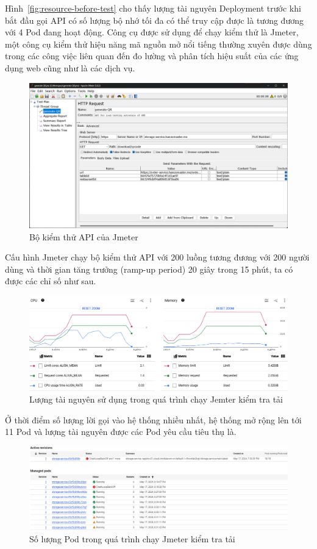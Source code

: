 Hình~\ref{fig:resource-before-test} cho thấy lượng tài nguyên Deployment trước khi bắt đầu gọi API có số lượng bộ nhớ tối đa có thể truy cập được là  tương đương với 4 Pod đang hoạt động.
Công cụ được sử dụng để chạy kiểm thử là Jmeter, một công cụ kiểm thử hiệu năng mã nguồn mở nổi tiếng thường xuyên được dùng trong các công việc liên quan đến đo lường và phân tích hiệu suất của các ứng dụng web cũng như là các dịch vụ.
\begin{figure}
    \centering
    \includegraphics[width=1\linewidth]{images/hChip/test/Jmeter-setup.png}
    \caption{Bộ kiểm thử API của Jmeter}
    \label{fig:Jmeter-API}
\end{figure}
Cấu hình Jmeter chạy bộ kiểm thử API với 200 luồng tương đương với 200 người dùng và thời gian tăng trưởng (ramp-up period) 20 giây trong 15 phút, ta có được các chỉ số như sau.
\begin{figure}
    \centering
    \includegraphics[width=1\linewidth]{images/hChip/test/resource-after-15m.png}
    \caption{Lượng tài nguyên sử dụng trong quá trình chạy Jemter kiểm tra tải}
    \label{fig:resource-after-15}
\end{figure}
Ở thời điểm số lượng lời gọi vào hệ thống nhiều nhất, hệ thống mở rộng lên tới 11 Pod và lượng tài nguyên được các Pod yêu cầu tiêu thụ là.
\begin{figure}
    \centering
    \includegraphics[width=1\linewidth]{images/hChip/test/pod-number-after-15m.png}
    \caption{Số lượng Pod trong quá trình chạy Jmeter kiểm tra tải}
    \label{fig:pod-number-after-15}
\end{figure}
